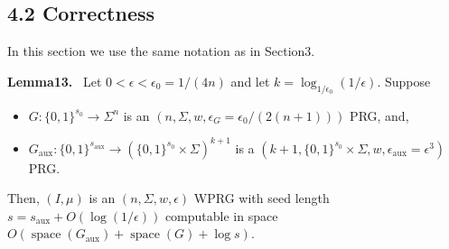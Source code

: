 \documentclass[10pt,a4paper]{article}
\newenvironment{authorclaim}[1]{\par\medskip\noindent\textbf{#1.}\ }{\par\medskip}
\begin{document}
\subsection*{4.2 Correctness}
In this section we use the same notation as in Section3.
\begin{authorclaim}{Lemma13}
Let $0<\epsilon<\epsilon_0=1/(4n)$ and let $k=\log_{1/\epsilon_0}(1/\epsilon)$. Suppose
\begin{itemize}
\item $G:\{0,1\}^{s_0}\to\Sigma^n$ is an $(n,\Sigma,w,\epsilon_G=\epsilon_0/(2(n+1)))$ PRG, and,
\item $G_{\mathrm{aux}}:\{0,1\}^{s_{\mathrm{aux}}}\to(\{0,1\}^{s_0}\times\Sigma)^{k+1}$ is a $(k+1,\{0,1\}^{s_0}\times\Sigma,w,\epsilon_{\mathrm{aux}}=\epsilon^3)$ PRG.
\end{itemize}
Then, $(I,\mu)$ is an $(n,\Sigma,w,\epsilon)$ WPRG with seed length $s=s_{\mathrm{aux}}+O(\log(1/\epsilon))$ computable in space $O(\operatorname{space}(G_{\mathrm{aux}})+\operatorname{space}(G)+\log s)$.
\end{authorclaim}
\end{document}
